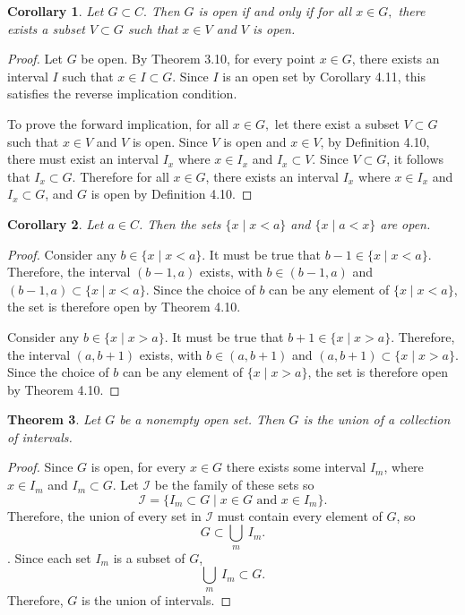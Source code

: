 \documentclass{amsart}
\newtheorem{theorem}{Theorem}
\newtheorem{corollary}[theorem]{Corollary}
\newcommand{\1}{\mathds{1}}
\numberwithin{equation}{section}
\numberwithin{theorem}{section}
\begin{document}
\begin{corollary} Let $G\subset C.$ Then $G$ is open if and only if for all $x\in G,$ there exists a subset $V\subset G$ such that $x\in V$ and $V$ is open. 
\end{corollary} 

\begin{proof}
	Let $G$ be open. By Theorem 3.10, for every point $x \in G$, there exists an interval $I$ such that $x \in I \subset G$. Since $I$ is an open set by Corollary 4.11, this satisfies the reverse implication condition.
	
	To prove the forward implication, for all $x\in G,$ let there exist a subset $V\subset G$ such that $x\in V$ and $V$ is open. Since $V$ is open and $x\in V$, by Definition 4.10, there must exist an interval $I_x$ where $x\in I_x$ and $I_x\subset V$. Since $V\subset G$, it follows that $I_x\subset G$. Therefore for all $x\in G$, there exists an interval $I_x$ where $x\in I_x$ and $I_x\subset G$, and $G$ is open by Definition 4.10.
\end{proof}

\begin{corollary}  Let $a \in C$.  Then the sets $\{ x \mid x < a\}$ and $\{x \mid a < x \}$ are open.
\end{corollary}

\begin{proof}
	Consider any $b\in \{ x \mid x < a\}$. It must be true that $b-1\in \{ x \mid x < a\}$. Therefore, the interval $(b-1,a)$ exists, with $b\in (b-1,a)$ and $(b-1,a)\subset \{ x \mid x < a\}$. Since the choice of $b$ can be any element of $\{ x \mid x < a\}$, the set is therefore open by Theorem 4.10. 
	
	Consider any $b\in \{ x \mid x > a\}$. It must be true that $b+1\in \{ x \mid x > a\}$. Therefore, the interval $(a,b+1)$ exists, with $b\in (a,b+1)$ and $(a,b+1)\subset \{ x \mid x > a\}$. Since the choice of $b$ can be any element of $\{ x \mid x > a\}$, the set is therefore open by Theorem 4.10.
\end{proof}

\begin{theorem}\label{union}  Let $G$ be a nonempty open set.  Then $G$ is the union of a collection of intervals.  
\end{theorem}

\begin{proof}
	Since $G$ is open, for every $x\in G$ there exists some interval $I_m$, where $x\in I_m$ and $I_m\subset G$. Let $\mathcal{I}$ be the family of these sets so $$\mathcal{I} = \{I_m \subset G\mid x\in G \text{ and } x\in I_m\}.$$ Therefore, the union of every set in $\mathcal{I}$ must contain every element of $G$, so $$G\subset \bigcup_m \ I_m.$$. Since each set $I_m$ is a subset of $G$, $$\bigcup_m \ I_m \subset G.$$ Therefore, $G$ is the union of intervals. 
\end{proof}
\end{document}
